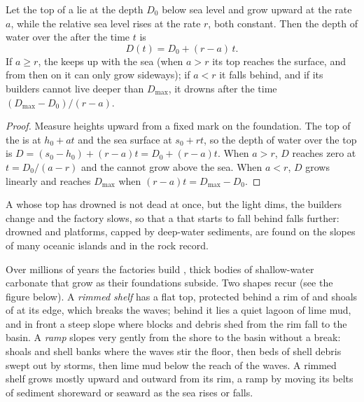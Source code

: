 \begin{proposition}\label{prop:b1:chemical-biogenic-sediments:keep-up}
Let the top of a  lie at the depth $D_0$ below sea level and grow upward at
the rate $a$, while the relative sea level rises at the rate $r$, both
constant. Then the depth of water over the  after the time $t$ is
\[
D(t) = D_0 + (r - a)\,t .
\]
If $a \ge r$, the  keeps up with the sea (when $a > r$ its top reaches the
surface, and from then on it can only grow sideways); if $a < r$ it falls
behind, and if its builders cannot live deeper than $D_{\max}$, it drowns after
the time $(D_{\max} - D_0)/(r - a)$.
\end{proposition}

\begin{proof}
Measure heights upward from a fixed mark on the foundation. The top of the 
is at $h_0 + a t$ and the sea surface at $s_0 + r t$, so the depth of water over
the top is $D = (s_0 - h_0) + (r - a)t = D_0 + (r-a)t$. When $a > r$, $D$
reaches zero at $t = D_0/(a-r)$ and the  cannot grow above the sea. When
$a < r$, $D$ grows linearly and reaches $D_{\max}$ when $(r-a)t = D_{\max} -
D_0$.
\end{proof}

A  whose top has drowned is not dead at once, but the light dims, the
builders change and the factory slows, so that a  that starts to fall
behind falls further: drowned  and platforms, capped by deep-water
sediments, are found on the slopes of many oceanic islands and in the rock
record.

Over millions of years the factories build , thick bodies
of shallow-water carbonate that grow as their foundations subside. Two shapes recur
(see the figure below). A \emph{rimmed shelf} has a
flat top, protected behind a rim of  and shoals of  at its edge, which
breaks the waves; behind it lies a quiet lagoon of lime mud, and in front a
steep slope where blocks and debris shed from the rim fall to the basin. A
\emph{ramp} slopes very gently from the shore to the basin without a break:  shoals and shell banks where the waves stir the floor,
then beds of shell debris swept out by storms, then lime mud below the reach of
the waves. A rimmed shelf grows mostly upward and outward from its rim, a ramp
by moving its belts of sediment shoreward or seaward as the sea rises or falls.

